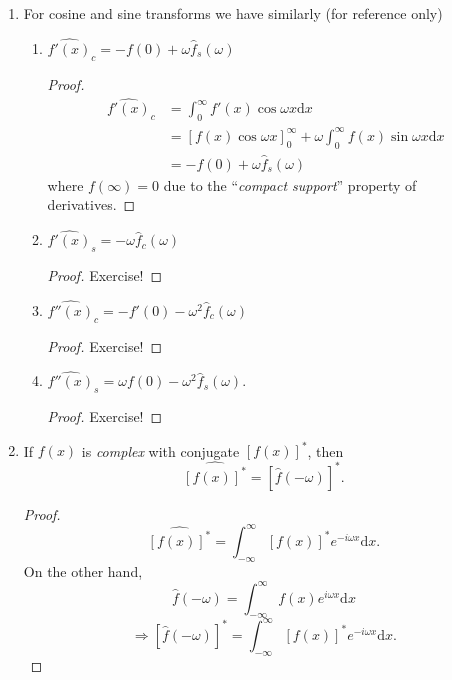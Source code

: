 \documentclass[12pt]{report}
\theoremstyle{definition}
\begin{document}
\begin{enumerate}[label = (\roman*)]
    \item For cosine and sine transforms we have similarly (for reference only)
        \begin{enumerate}[label = (\alph*)]
            \item ${\widehat{f'(x)}}_c = -f(0)+\omega\hat{f}_s(\omega)$
                \begin{proof}
                    \begin{align*}
                        {\widehat{f'(x)}}_c
                        & = \int_{0}^{\infty} f'(x) \cos{\omega x}\mathrm{d}x \\
                        & = {\left[f(x)\cos{\omega x}\right]}_0^{\infty}
                        + \omega \int_{0}^{\infty} f(x) \sin{\omega x}\mathrm{d}x \\
                        & = - f(0) +\omega\hat{f}_s(\omega)
                    \end{align*}
                    where $f(\infty)=0$ due to the ``\emph{compact support}'' property of derivatives.
                \end{proof} 

            \item ${\widehat{f'(x)}}_s = -\omega\hat{f}_c(\omega)$
                \begin{proof}
                    Exercise!
                \end{proof} 

            \item ${\widehat{f''(x)}}_c = -f'(0) - \omega^{2}\hat{f}_c(\omega)$
                \begin{proof}
                    Exercise!
                \end{proof} 

            \item ${\widehat{f''(x)}}_s = \omega f(0) - \omega^{2}\hat{f}_s(\omega)$.
                \begin{proof}
                    Exercise!
                \end{proof} 

        \end{enumerate}

    \item If $f(x)$ is \emph{complex} with conjugate ${[f(x)]}^{*}$, then\[
            \widehat{{[f(x)]}^{*}} = {[\hat{f}(-\omega)]}^{*}.
        \]
        \begin{proof}
            \[
                \widehat{{[f(x)]}^{*}} = \int_{-\infty}^{\infty} {[f(x)]}^{*}e^{-i\omega x}\mathrm{d}x.
            \]
            On the other hand,\[
                \hat{f}(-\omega) = \int_{-\infty}^{\infty} f(x)e^{i\omega x}\mathrm{d}x
            \]\[
            \Rightarrow{}{[\hat{f}(-\omega)]}^{*} = \int_{-\infty}^{\infty} {[f(x)]}^{*}e^{-i\omega x}\mathrm{d}x.
            \]
        \end{proof} 
\end{enumerate}
\end{document}
